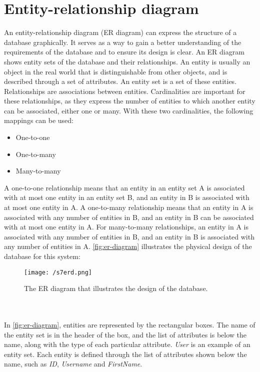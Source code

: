 \section{Entity-relationship diagram}
An entity-relationship diagram (ER diagram) can express the structure of a database graphically\cite{DBConcepts}.
It serves as a way to gain a better understanding of the requirements of the database and to ensure its design is clear.
An ER diagram shows entity sets of the database and their relationships.
An entity is usually an object in the real world that is distinguishable from other objects, and is described through a set of attributes.
An entity set is a set of these entities.
Relationships are associations between entities.
Cardinalities are important for these relationships, as they express the number of entities to which another entity can be associated\cite{DBConcepts}, either one or many.
With these two cardinalities, the following mappings can be used:
\begin{itemize}
    \item One-to-one
    \item One-to-many
    \item Many-to-many
\end{itemize}
A one-to-one relationship means that an entity in an entity set A is associated with at most one entity in an entity set B, and an entity in B is associated with at most one entity in A.
A one-to-many relationship means that an entity in A is associated with any number of entities in B, and an entity in B can be associated with at most one entity in A.
For many-to-many relationships, an entity in A is associated with any number of entities in B, and an entity in B is associated with any number of entities in A\cite{DBConcepts}.
\autoref{fig:er-diagram} illustrates the physical design of the database for this system:
\begin{sidewaysfigure}[]
    \centering
    \texttt{[image: /s7erd.png]}
    \caption{The ER diagram that illustrates the design of the database.}
    \label{fig:er-diagram}
\end{sidewaysfigure}
\\\\
In \autoref{fig:er-diagram}, entities are represented by the rectangular boxes.
The name of the entity set is in the header of the box, and the list of attributes is below the name, along with the type of each particular attribute.
\textit{User} is an example of an entity set.
Each entity is defined through the list of attributes shown below the name, such as \textit{ID}, \textit{Username} and \textit{FirstName}.
